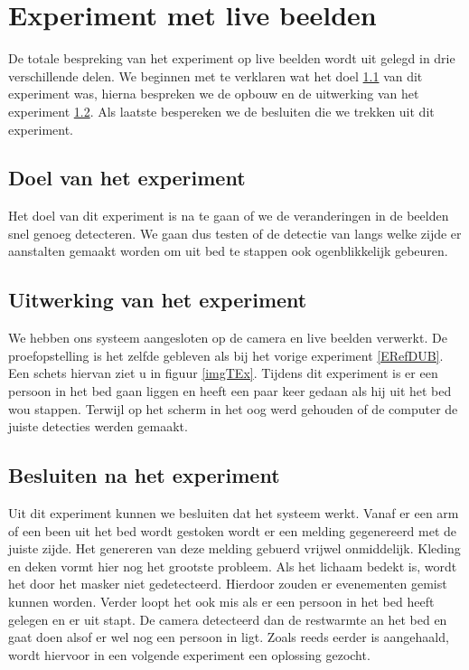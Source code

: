 \section{Experiment met live beelden}
\label{ERefELB}
De totale bespreking van het experiment op live beelden wordt uit gelegd in drie verschillende delen. We beginnen met te verklaren wat het doel \ref{ERefLBD} van dit experiment was, hierna bespreken we de opbouw en de uitwerking van het experiment \ref{ERefLBV}. Als laatste bespereken we de besluiten die we trekken uit dit experiment. 

\subsection{Doel van het experiment}
\label{ERefLBD}
Het doel van dit experiment is na te gaan of we de veranderingen in de beelden snel genoeg detecteren. We gaan dus testen of de detectie van langs welke zijde er aanstalten gemaakt worden om uit bed te stappen ook ogenblikkelijk gebeuren. 

\subsection{Uitwerking van het experiment}
\label{ERefLBV}
We  hebben ons systeem aangesloten op de camera en live beelden verwerkt. De proefopstelling is het zelfde gebleven als bij het vorige experiment \ref{ERefDUB}. Een schets hiervan ziet u in figuur \ref{imgTEx}. Tijdens dit experiment is er een persoon in het bed gaan liggen en heeft een paar keer gedaan als hij uit het bed wou stappen. Terwijl op het scherm in het oog werd gehouden of de computer de juiste detecties werden gemaakt.

\subsection{Besluiten na het experiment}
 Uit dit experiment kunnen we besluiten dat het systeem werkt. Vanaf er een arm of een been uit het bed wordt gestoken wordt er een melding gegenereerd met de juiste zijde. Het genereren van deze melding gebuerd vrijwel onmiddelijk. Kleding en deken vormt hier nog het grootste probleem. Als het lichaam bedekt is, wordt het door het masker niet gedetecteerd. Hierdoor zouden er evenementen gemist kunnen worden. Verder loopt het ook mis als er een persoon in het bed heeft gelegen en er uit stapt. De camera detecteerd dan de restwarmte an het bed en gaat doen alsof er wel nog een persoon in ligt. Zoals reeds eerder is aangehaald, wordt hiervoor in een volgende experiment een oplossing gezocht. 
 
